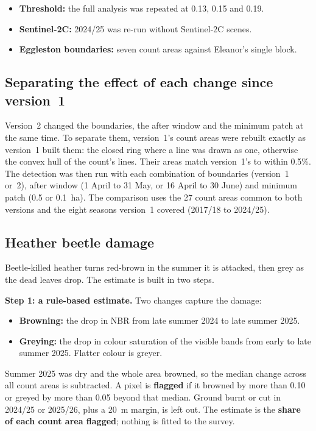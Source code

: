 \documentclass[11pt,a4paper]{article}
\begin{document}
\begin{itemize}
\item \textbf{Threshold:} the full analysis was repeated at 0.13, 0.15 and 0.19.
\item \textbf{Sentinel-2C:} 2024/25 was re-run without Sentinel-2C scenes.
\item \textbf{Eggleston boundaries:} seven count areas against Eleanor's single block.
\end{itemize}

\subsection{Separating the effect of each change since version~1}\label{sec:methods-ablation}

Version~2 changed the boundaries, the after window and the minimum patch at the same time. To separate them, version~1's count areas were rebuilt exactly as version~1 built them: the closed ring where a line was drawn as one, otherwise the convex hull of the count's lines. Their areas match version~1's to within 0.5\%. The detection was then run with each combination of boundaries (version~1 or~2), after window (1 April to 31 May, or 16 April to 30 June) and minimum patch (0.5 or 0.1~ha). The comparison uses the 27 count areas common to both versions and the eight seasons version~1 covered (2017/18 to 2024/25).

\subsection{Heather beetle damage}\label{sec:methods-beetle}

Beetle-killed heather turns red-brown in the summer it is attacked, then grey as the dead leaves drop. The estimate is built in two steps.

\textbf{Step 1: a rule-based estimate.} Two changes capture the damage:
\begin{itemize}
\item \textbf{Browning:} the drop in NBR from late summer 2024 to late summer 2025.
\item \textbf{Greying:} the drop in colour saturation of the visible bands from early to late summer 2025. Flatter colour is greyer.
\end{itemize}
Summer 2025 was dry and the whole area browned, so the median change across all count areas is subtracted. A pixel is \textbf{flagged} if it browned by more than 0.10 or greyed by more than 0.05 beyond that median. Ground burnt or cut in 2024/25 or 2025/26, plus a 20~m margin, is left out. The estimate is the \textbf{share of each count area flagged}; nothing is fitted to the survey.
\end{document}
